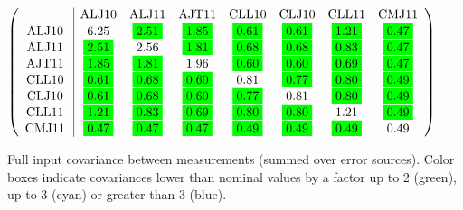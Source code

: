 \begin{table}[H]
\scriptsize
\begin{center}
\renewcommand{\arraystretch}{1.1}
\begin{math}\left(\begin{array}{c|ccccccc}
 & \mathrm{ALJ10} & 
\mathrm{ALJ11} & 
\mathrm{AJT11} & 
\mathrm{CLL10} & 
\mathrm{CLJ10} & 
\mathrm{CLL11} & 
\mathrm{CMJ11} \\
\hline
\mathrm{ALJ10} \hspace*{2pt} &       6.25 &  \colorbox{Green1}{$      2.51$} &  \colorbox{Green1}{$      1.85$} &  \colorbox{Green1}{$      0.61$} &  \colorbox{Green1}{$      0.61$} &  \colorbox{Green1}{$      1.21$} &  \colorbox{Green1}{$      0.47$} \\
\mathrm{ALJ11} \hspace*{2pt} &  \colorbox{Green1}{$      2.51$} &       2.56 &  \colorbox{Green1}{$      1.81$} &  \colorbox{Green1}{$      0.68$} &  \colorbox{Green1}{$      0.68$} &  \colorbox{Green1}{$      0.83$} &  \colorbox{Green1}{$      0.47$} \\
\mathrm{AJT11} \hspace*{2pt} &  \colorbox{Green1}{$      1.85$} &  \colorbox{Green1}{$      1.81$} &       1.96 &  \colorbox{Green1}{$      0.60$} &  \colorbox{Green1}{$      0.60$} &  \colorbox{Green1}{$      0.69$} &  \colorbox{Green1}{$      0.47$} \\
\mathrm{CLL10} \hspace*{2pt} &  \colorbox{Green1}{$      0.61$} &  \colorbox{Green1}{$      0.68$} &  \colorbox{Green1}{$      0.60$} &       0.81 &  \colorbox{Green1}{$      0.77$} &  \colorbox{Green1}{$      0.80$} &  \colorbox{Green1}{$      0.49$} \\
\mathrm{CLJ10} \hspace*{2pt} &  \colorbox{Green1}{$      0.61$} &  \colorbox{Green1}{$      0.68$} &  \colorbox{Green1}{$      0.60$} &  \colorbox{Green1}{$      0.77$} &       0.81 &  \colorbox{Green1}{$      0.80$} &  \colorbox{Green1}{$      0.49$} \\
\mathrm{CLL11} \hspace*{2pt} &  \colorbox{Green1}{$      1.21$} &  \colorbox{Green1}{$      0.83$} &  \colorbox{Green1}{$      0.69$} &  \colorbox{Green1}{$      0.80$} &  \colorbox{Green1}{$      0.80$} &       1.21 &  \colorbox{Green1}{$      0.49$} \\
\mathrm{CMJ11} \hspace*{2pt} &  \colorbox{Green1}{$      0.47$} &  \colorbox{Green1}{$      0.47$} &  \colorbox{Green1}{$      0.47$} &  \colorbox{Green1}{$      0.49$} &  \colorbox{Green1}{$      0.49$} &  \colorbox{Green1}{$      0.49$} &       0.49 \\
\end{array}\right)\end{math}
\caption{Full input covariance between measurements (summed over error sources). Color boxes indicate covariances lower than nominal values by a factor up to 2 (green), up to 3 (cyan) or greater than 3 (blue).}
\renewcommand{\arraystretch}{1}
\end{center}
\end{table}
